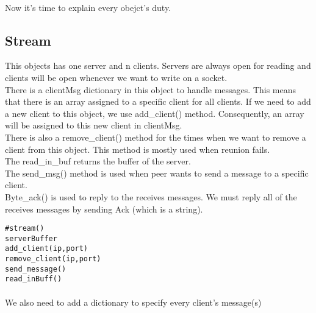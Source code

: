 \documentclass{article}
\begin{document}
\paragraph{}Now it's time to explain every obejct's duty.
\subsection{Stream}This objects has one server and n clients. Servers are always open for reading and clients will be open whenever we want to write on a socket. \\
There is a clientMsg dictionary in this object to handle messages. This means that there is an array assigned to a specific client for all clients. If we need to add a new client to this object, we use add\_client() method. Consequently, an array will be assigned to this new client in clientMsg.\\
There is also a remove\_client() method for the times when we want to remove a client from this object. This method is mostly used  when reunion fails.\\
The read\_in_buf returns the buffer of the server.\\
The send\_msg() method is used when peer wants to send a message to a specific client.\\
Byte\_ack() is used to reply to the receives messages. We must reply all of the receives messages by sending Ack (which is a string).\\
\begin{lstlisting}
#stream()
serverBuffer
add_client(ip,port)
remove_client(ip,port)
send_message()
read_inBuff()
\end{lstlisting}
\paragraph{}We also need to add a dictionary to specify every client's message(s)
\end{document}
